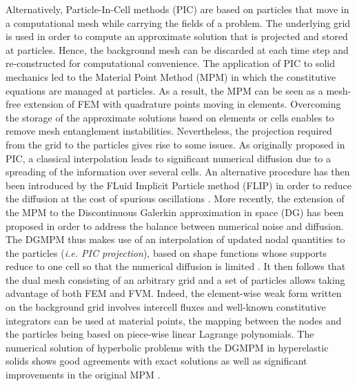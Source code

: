 Alternatively, Particle-In-Cell methods (PIC) \cite{PIC} are based on particles that move in a computational mesh while carrying the fields of a problem.
The underlying grid is used in order to compute an approximate solution that is projected and stored at particles.
Hence, the background mesh can be discarded at each time step and re-constructed for computational convenience.
The application of PIC to solid mechanics led to the Material Point Method (MPM) \cite{Sulsky94} in which the constitutive equations are managed at particles.
As a result, the MPM can be seen as a mesh-free extension of FEM with quadrature points moving in elements.
Overcoming the storage of the approximate solutions based on elements or cells enables to remove mesh entanglement instabilities.
Nevertheless, the projection required from the grid to the particles gives rise to some issues.
As originally proposed in PIC, a classical interpolation leads to significant numerical diffusion due to a spreading of the information over several cells.
An alternative procedure has then been introduced by the FLuid Implicit Particle method (FLIP) \cite{FLIP0} in order to reduce the diffusion at the cost of spurious oscillations \cite{XPIC}.
More recently, the extension of the MPM to the Discontinuous Galerkin approximation in space (DG) \cite{NeutronDG} has been proposed in order to address the balance between numerical noise and diffusion.
The DGMPM \cite{DGMPM} thus makes use of an interpolation of updated nodal quantities to the particles (\textit{i.e. PIC projection}), based on shape functions whose supports reduce to one cell so that the numerical diffusion is limited \cite{Thesis}.
It then follows that the dual mesh consisting of an arbitrary grid and a set of particles allows taking advantage of both FEM and FVM.
Indeed, the element-wise weak form written on the background grid involves intercell fluxes and well-known constitutive integrators \cite{Simo} can be used at material points, the mapping between the nodes and the particles being based on piece-wise linear Lagrange polynomials.
The numerical solution of hyperbolic problems with the DGMPM in hyperelastic solids shows good agreements with exact solutions as well as significant improvements in the original MPM \cite{DGMPM}.

